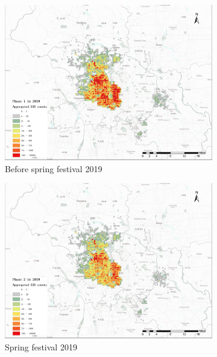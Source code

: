 \documentclass[preprints,ijgi,submit,moreauthors]{Definitions/mdpi}
\begin{document}
\begin{figure}[H]
    \begin{subfigure}{.3\textwidth}
        \includegraphics[width=\textwidth]{Figures/2019phase1(1).png}
        \caption{Before spring festival 2019}
    \end{subfigure}
    \begin{subfigure}{.3\textwidth}
        \includegraphics[width=\textwidth]{Figures/2019phase2(1).png}
        \caption{Spring festival 2019}
    \end{subfigure}
    \begin{subfigure}{.3\textwidth}

\end{subfigure}
\end{figure}
\end{document}
